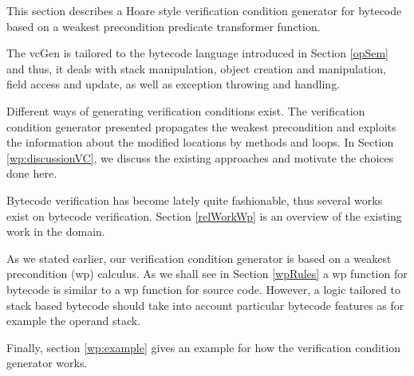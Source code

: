 
This section describes a Hoare style verification condition generator for bytecode based on a weakest precondition predicate transformer function.
 

The vcGen is tailored to the bytecode language introduced in Section \ref{opSem} and thus, it deals
with stack manipulation, object creation and manipulation, field access and update, as well as exception throwing and handling.

Different ways of generating verification conditions exist. The verification condition
 generator presented  propagates the weakest precondition and exploits the information 
about the modified locations by methods and loops. 
In Section \ref{wp:discussionVC}, we discuss the existing approaches and motivate the choices done here.

Bytecode verification has become lately quite fashionable, thus several works exist on bytecode verification. Section \ref{relWorkWp}
is an overview of the existing work in the domain.





As we stated earlier, our verification condition generator is based on a weakest precondition (wp) calculus. As we shall see in Section  \ref{wpRules}
a wp function for bytecode is similar to a wp function for source code. However, a logic tailored to stack based bytecode should take into account 
particular bytecode features as for example the operand stack.

Finally, section \ref{wp:example} gives an example for how the verification condition generator works.

 





 
